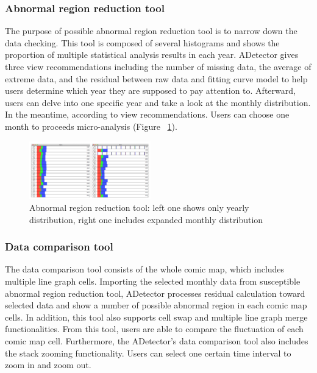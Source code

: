 \documentclass{vgtc}                          %
\begin{document}
\subsubsection{Abnormal region reduction tool}
The purpose of possible abnormal region reduction tool is to narrow down the data checking. This tool is composed of several histograms and shows the proportion of multiple statistical analysis results in each year. ADetector gives three view recommendations including the number of missing data, the average of extreme data, and the residual between raw data and fitting curve model to help users determine which year they are supposed to pay attention to. Afterward, users can delve into one specific year and take a look at the monthly distribution. In the meantime, according to view recommendations. Users can choose one month to proceeds micro-analysis (Figure ~\ref{fig:region}).

\begin{figure}[htb]
	\centering
	\includegraphics[width=0.47\textwidth]{region.png}
	\caption{Abnormal region reduction tool: left one shows only yearly distribution, right one includes expanded monthly distribution}
	\label{fig:region}
\end{figure}

\subsubsection{Data comparison tool}

The data comparison tool consists of the whole comic map, which includes multiple line graph cells. Importing the selected monthly data from susceptible abnormal region reduction tool, ADetector processes residual calculation toward selected data and show a number of possible abnormal region in each comic map cells. In addition, this tool also supports cell swap and multiple line graph merge functionalities. From this tool, users are able to compare the fluctuation of each comic map cell. Furthermore, the ADetector's data comparison tool also includes the stack zooming functionality. Users can select one certain time interval to zoom in and zoom out. 

\end{document}
